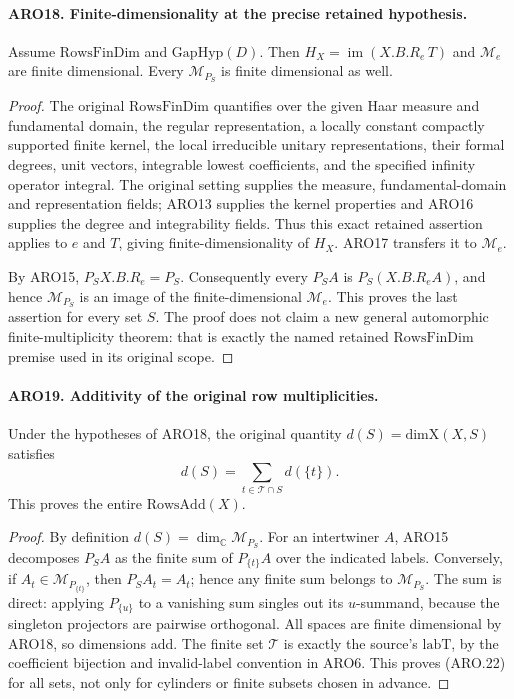 \paragraph{ARO18. Finite-dimensionality at the precise retained hypothesis.}
\label{claim:ARO18}
Assume \(\mathrm{RowsFinDim}\) and \(\mathrm{GapHyp}(D)\).
Then \(H_X=\operatorname{im}(X.B.R_e\,T)\) and
\(\mathcal M_e\) are finite dimensional.  Every
\(\mathcal M_{P_S}\) is finite dimensional as well.
\begin{proof}
The original \(\mathrm{RowsFinDim}\) quantifies over the given
Haar measure and fundamental domain, the regular representation,
a locally constant compactly supported finite kernel, the local
irreducible unitary representations, their formal degrees, unit
vectors, integrable lowest coefficients, and the specified infinity
operator integral.  The original setting supplies the measure,
fundamental-domain and representation fields; ARO13 supplies the
kernel properties and ARO16 supplies the degree and integrability
fields.  Thus this exact retained assertion applies to \(e\) and
\(T\), giving finite-dimensionality of \(H_X\).
ARO17 transfers it to \(\mathcal M_e\).

By ARO15, \(P_SX.B.R_e=P_S\).  Consequently every
\(P_S A\) is \(P_S(X.B.R_eA)\), and hence
\(\mathcal M_{P_S}\) is an image of the finite-dimensional
\(\mathcal M_e\).  This proves the last assertion for every set
\(S\).  The proof does not claim a new general automorphic
finite-multiplicity theorem: that is exactly the named retained
\(\mathrm{RowsFinDim}\) premise used in its original scope.
\end{proof}

\paragraph{ARO19. Additivity of the original row multiplicities.}
\label{claim:ARO19}
Under the hypotheses of ARO18, the original quantity
\(d(S)=\mathrm{dimX}(X,S)\) satisfies
\[
                  d(S)=\sum_{t\in\mathcal T\cap S}d(\{t\}).
 \tag{ARO.22}
\]
This proves the entire \(\mathrm{RowsAdd}(X)\).
\begin{proof}
By definition \(d(S)=\dim_{\mathbb C}\mathcal M_{P_S}\).
For an intertwiner \(A\), ARO15 decomposes \(P_SA\) as the
finite sum of \(P_{\{t\}}A\) over the indicated labels.  Conversely,
if \(A_t\in\mathcal M_{P_{\{t\}}}\), then
\(P_S A_t=A_t\); hence any finite sum belongs to
\(\mathcal M_{P_S}\).  The sum is direct: applying
\(P_{\{u\}}\) to a vanishing sum singles out its \(u\)-summand,
because the singleton projectors are pairwise orthogonal.
All spaces are finite dimensional by ARO18, so dimensions add.
The finite set \(\mathcal T\) is exactly the source's
\(\mathrm{labT}\), by the coefficient bijection and invalid-label
convention in ARO6.  This proves (ARO.22) for all sets, not only
for cylinders or finite subsets chosen in advance.
\end{proof}

